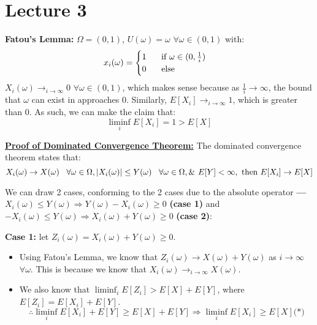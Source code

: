 \section{Lecture 3}

\begin{exmp}\textbf{Fatou's Lemma:}
    $\Omega = (0,1)$, $U(\omega) = \omega$ $\forall \omega \in (0,1)$ with:
    \begin{equation*}
        x_i(\omega) = \begin{cases}
            1 \hspace{0.5cm} \text{ if }\omega \in (0, \frac{1}{i}) \\
            0 \hspace{0.5cm} \text{ else }
        \end{cases}
    \end{equation*}
     $X_i(\omega) \rightarrow_{i\rightarrow\infty} 0$ $\forall \omega\in(0,1)$, which makes sense because as $\frac{1}{i} \rightarrow \infty$, the bound that $\omega$ can exist in approaches 0. Similarly, $E[X_i] \rightarrow_{i\rightarrow\infty} 1$, which is greater than 0. As such, we can make the claim that:
     \begin{equation*}
         \liminf_iE[X_i] = 1 > E[X]
     \end{equation*}
\end{exmp}

\underline{\textbf{Proof of Dominated Convergence Theorem:}} The dominated convergence theorem states that:
\begin{equation*}
    X_i(\omega) \rightarrow X(\omega) \hspace{0.3cm} \forall \omega \in \Omega, |X_i(\omega)| \leq Y(\omega) \hspace{0.3cm} \forall \omega  \in \Omega, \&  \hspace{0.13cm}E[Y] < \infty, \text{ then } E[X_i] \rightarrow E[X]
\end{equation*}

We can draw 2 cases, conforming to the 2 cases due to the absolute operator \textbf{---} $X_i(\omega) \leq Y(\omega) \Rightarrow Y(\omega) - X_i(\omega) \geq 0$ \textbf{(case 1)} and $-X_i(\omega) \leq Y(\omega) \Rightarrow X_i(\omega) + Y(\omega) \geq 0$ \textbf{(case 2)}:

\textbf{Case 1:} let $Z_i(\omega) = X_i(\omega) + Y(\omega) \geq 0$.

\begin{itemize}
    \item Using Fatou's Lemma, we know that $Z_i(\omega) \rightarrow X(\omega) + Y(\omega)$ as $i \rightarrow \infty$ $\forall \omega$. This is because we know that $X_i(\omega) \rightarrow_{i\rightarrow\infty} X(\omega)$.
    \item We also know that $\liminf_i E[Z_i] > E[X] + E[Y]$, where $E[Z_i] = E[X_i] + E[Y]$.
    \begin{equation*}
        \therefore \liminf_i E[X_i] + E[Y] \geq E[X] + E[Y] \Rightarrow \liminf_i E[X_i] \geq E[X] \textbf{(*)}
    \end{equation*}
\end{itemize}

